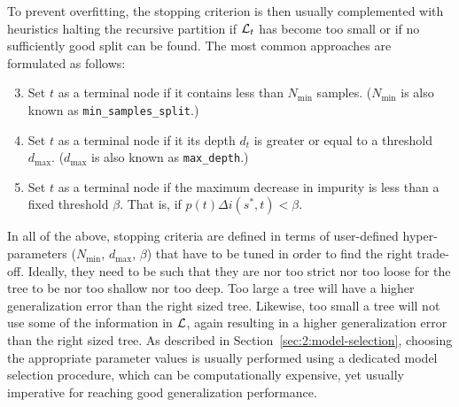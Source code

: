To prevent overfitting, the stopping criterion is then usually complemented
with heuristics halting the recursive partition if ${\cal L}_t$ has become too
small or if no sufficiently good split can be found. The most common approaches
are formulated as follows:

\begin{enumerate}\setcounter{enumi}{2}

\item Set $t$ as a terminal node if it contains less than $N_\text{min}$ samples.
($N_\text{min}$ is also known as \texttt{min\_samples\_split}.)

\item Set $t$ as a terminal node if it its depth $d_t$ is greater or equal to a threshold $d_\text{max}$.
($d_\text{max}$ is also known as \texttt{max\_depth}.)

\item Set $t$ as a terminal node if the maximum decrease in impurity is less than
a fixed threshold $\beta$. That is, if $p(t) \Delta i(s^*, t) < \beta$.

\end{enumerate}

In all of the above, stopping criteria are defined in terms of user-defined
hyper-parameters ($N_\text{min}$, $d_\text{max}$, $\beta$) that have to be
tuned in order to find the right trade-off. Ideally, they need to
be such that they are nor too strict nor too loose for the tree to be nor too
shallow nor too deep. Too large a tree will have a higher generalization error
than the right sized tree. Likewise, too small a tree will not use some of the
information in ${\cal L}$, again resulting in a higher generalization error
than the right sized tree. As described in Section~\ref{sec:2:model-selection},
choosing the appropriate parameter values is usually performed using a dedicated
model selection procedure, which can be computationally expensive, yet usually
imperative for reaching good generalization performance.

